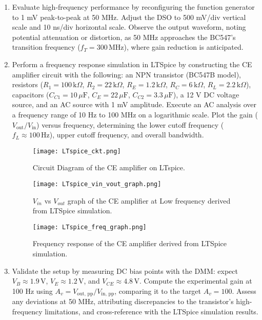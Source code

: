 \documentclass[conference]{IEEEtran}
\begin{document}
\begin{enumerate}
    \item Evaluate high-frequency performance by reconfiguring the function generator to 1 mV peak-to-peak at 50 MHz. Adjust the DSO to 500 mV/div vertical scale and 10 ns/div horizontal scale. Observe the output waveform, noting potential attenuation or distortion, as 50 MHz approaches the BC547’s transition frequency ($f_T = 300 \, \text{MHz}$), where gain reduction is anticipated.

    \item Perform a frequency response simulation in LTSpice by constructing the CE amplifier circuit with the following: an NPN transistor (BC547B model), resistors ($R_1 = 100 \, \text{k}\Omega$, $R_2 = 22 \, \text{k}\Omega$, $R_E = 1.2 \, \text{k}\Omega$, $R_C = 6 \, \text{k}\Omega$, $R_L = 2.2 \, \text{k}\Omega$), capacitors ($C_{C1} = 10 \, \mu\text{F}$, $C_E = 22 \, \mu\text{F}$, $C_{C2} = 3.3 \, \mu\text{F}$), a 12 V DC voltage source, and an AC source with 1 mV amplitude. Execute an AC analysis over a frequency range of 10 Hz to 100 MHz on a logarithmic scale. Plot the gain ($V_{\text{out}}/V_{\text{in}}$) versus frequency, determining the lower cutoff frequency ($f_L \approx 100 \, \text{Hz}$), upper cutoff frequency, and overall bandwidth.
        \begin{figure}[h]
            \centering
            \texttt{[image: LTspice\_ckt.png]} %
            \caption{Circuit Diagram of the CE amplifier on LTspice.}
            \label{fig:freq_response}
        \end{figure}
        \begin{figure}[h]
            \centering
            \texttt{[image: LTspice\_vin\_vout\_graph.png]} %
            \caption{$V_{in}$ vs $V_{out}$ graph of the CE amplifier at Low frequency derived from LTSpice simulation.}
            \label{fig:freq_response}
        \end{figure}
        \begin{figure}[h]
            \centering
            \texttt{[image: LTspice\_freq\_graph.png]} %
            \caption{Frequency response of the CE amplifier derived from LTSpice simulation.}
            \label{fig:freq_response}
        \end{figure}
    \item Validate the setup by measuring DC bias points with the DMM: expect $V_B \approx 1.9 \, \text{V}$, $V_E \approx 1.2 \, \text{V}$, and $V_{CE} \approx 4.8 \, \text{V}$. Compute the experimental gain at 100 Hz using $A_v = V_{\text{out, pp}} / V_{\text{in, pp}}$, comparing it to the target $A_v = 100$. Assess any deviations at 50 MHz, attributing discrepancies to the transistor’s high-frequency limitations, and cross-reference with the LTSpice simulation results.
\end{enumerate}
\end{document}
